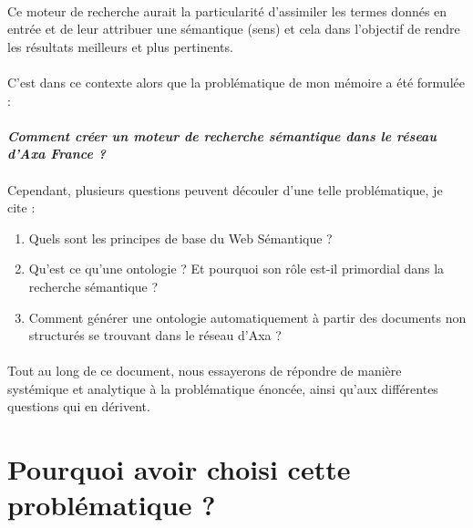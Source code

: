 \documentclass[12pt, a4paper, oneside]{book}
\begin{document}
\paragraph{}
Ce moteur de recherche aurait la particularité d'assimiler les termes donnés en entrée et de leur attribuer une sémantique (sens) et cela dans l'objectif de rendre les résultats meilleurs et plus pertinents.


\paragraph{}
C'est dans ce contexte alors que la problématique de mon mémoire a été formulée : 

\paragraph{}
\emph{\textbf{Comment créer un moteur de recherche sémantique dans le réseau d'Axa France ?} 
}

\paragraph{}
Cependant, plusieurs questions peuvent découler d'une telle problématique, je cite : 

\begin{enumerate}


\item Quels sont les principes de base du Web Sémantique ?
\item Qu'est ce qu'une ontologie ?  Et pourquoi son rôle est-il primordial dans la recherche sémantique ? 
\item Comment générer une ontologie automatiquement à partir des documents non structurés se trouvant dans le réseau d'Axa ? 


\end{enumerate}



\paragraph{}
Tout au long de ce document, nous essayerons de répondre de manière systémique et analytique à la problématique énoncée, ainsi qu'aux différentes questions qui en dérivent. 

\pagebreak

\section{Pourquoi avoir choisi cette problématique ?}
\end{document}
